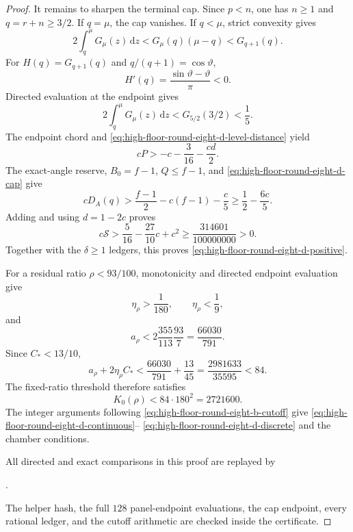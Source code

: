 \documentclass[11pt]{article}
\theoremstyle{remark}
\newcommand{\dd}{\,\mathrm d}
\begin{document}
\begin{proof}
It remains to sharpen the terminal cap.  Since $p<n$, one has $n\geq1$
and $q=r+n\geq3/2$.  If $q=\mu$, the cap vanishes.  If $q<\mu$, strict
convexity gives
\[
 2\int_q^\mu G_\mu(z)\dd z
 <G_\mu(q)(\mu-q)<G_{q+1}(q).
\]
For $H(q)=G_{q+1}(q)$ and $q/(q+1)=\cos\vartheta$,
\[
 H'(q)=\frac{\sin\vartheta-\vartheta}{\pi}<0.
\]
Directed evaluation at the endpoint gives
\begin{equation}
 \boxed{
 2\int_q^\mu G_\mu(z)\dd z
 <G_{5/2}(3/2)<\frac15.}
 \label{eq:high-floor-round-eight-d-cap}
\end{equation}
The endpoint chord and
\eqref{eq:high-floor-round-eight-d-level-distance} yield
\[
 cP>-c-\frac3{16}-\frac{cd}{2}.
\]
The exact-angle reserve, $B_0=f-1$, $Q\leq f-1$, and
\eqref{eq:high-floor-round-eight-d-cap} give
\[
 cD_A(q)>
 \frac{f-1}{2}-c(f-1)-\frac c5
 \geq\frac12-\frac{6c}{5}.
\]
Adding and using $d=1-2c$ proves
\begin{equation}
 c\mathcal S>
 \frac5{16}-\frac{27}{10}c+c^2
 \geq\frac{314601}{100000000}>0.
 \label{eq:high-floor-round-eight-d-small-delta}
\end{equation}
Together with the $\delta\geq1$ ledgers, this proves
\eqref{eq:high-floor-round-eight-d-positive}.

For a residual ratio $\rho<93/100$, monotonicity and directed endpoint
evaluation give
\[
 \eta_\rho>\frac1{180},\qquad \eta_\rho<\frac19,
\]
and
\[
 a_\rho<
 2\frac{355}{113}\frac{93}{7}
 =\frac{66030}{791}.
\]
Since $C_*<13/10$,
\[
 a_\rho+2\eta_\rho C_*
 <\frac{66030}{791}+\frac{13}{45}
 =\frac{2981633}{35595}<84.
\]
The fixed-ratio threshold therefore satisfies
\begin{equation}
 \boxed{K_0(\rho)<84\mathbin{\cdot}180^2=2721600.}
 \label{eq:high-floor-round-eight-d-cutoff}
\end{equation}
The integer arguments following
\eqref{eq:high-floor-round-eight-b-cutoff} give
\eqref{eq:high-floor-round-eight-d-continuous}--%
\eqref{eq:high-floor-round-eight-d-discrete} and the chamber conditions.

All directed and exact comparisons in this proof are replayed by
\begin{center}
 \small{}.
\end{center}
The helper hash, the full $128$ panel-endpoint evaluations, the cap
endpoint, every rational ledger, and the cutoff arithmetic are checked
inside the certificate.
\end{proof}
\end{document}
